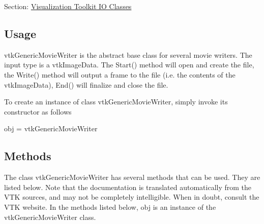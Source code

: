 Section\-: \hyperlink{sec_vtkio}{Visualization Toolkit I\-O Classes} \hypertarget{vtkwidgets_vtkxyplotwidget_Usage}{}\subsection{Usage}\label{vtkwidgets_vtkxyplotwidget_Usage}
vtk\-Generic\-Movie\-Writer is the abstract base class for several movie writers. The input type is a vtk\-Image\-Data. The Start() method will open and create the file, the Write() method will output a frame to the file (i.\-e. the contents of the vtk\-Image\-Data), End() will finalize and close the file.

To create an instance of class vtk\-Generic\-Movie\-Writer, simply invoke its constructor as follows \begin{DoxyVerb}  obj = vtkGenericMovieWriter
\end{DoxyVerb}
 \hypertarget{vtkwidgets_vtkxyplotwidget_Methods}{}\subsection{Methods}\label{vtkwidgets_vtkxyplotwidget_Methods}
The class vtk\-Generic\-Movie\-Writer has several methods that can be used. They are listed below. Note that the documentation is translated automatically from the V\-T\-K sources, and may not be completely intelligible. When in doubt, consult the V\-T\-K website. In the methods listed below, {\ttfamily obj} is an instance of the vtk\-Generic\-Movie\-Writer class. 
